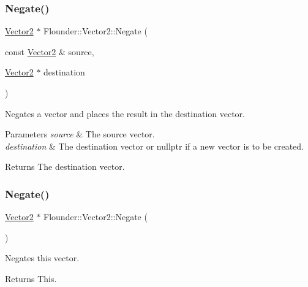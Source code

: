 \subsubsection{\texorpdfstring{Negate()}{Negate()}\hspace{0.1cm}{\footnotesize\ttfamily [1/2]}}
{\footnotesize\ttfamily \hyperlink{class_flounder_1_1_vector2}{Vector2} $\ast$ Flounder\+::\+Vector2\+::\+Negate (\begin{DoxyParamCaption}\item[{const \hyperlink{class_flounder_1_1_vector2}{Vector2} \&}]{source,  }\item[{\hyperlink{class_flounder_1_1_vector2}{Vector2} $\ast$}]{destination }\end{DoxyParamCaption})\hspace{0.3cm}{\ttfamily [static]}}



Negates a vector and places the result in the destination vector. 


\begin{DoxyParams}{Parameters}
{\em source} & The source vector. \\
\hline
{\em destination} & The destination vector or nullptr if a new vector is to be created. \\
\hline
\end{DoxyParams}
\begin{DoxyReturn}{Returns}
The destination vector. 
\end{DoxyReturn}
\mbox{\label{class_flounder_1_1_vector2_a1822df39dd87d89831ccf9b0d264607a}} 
\subsubsection{\texorpdfstring{Negate()}{Negate()}\hspace{0.1cm}{\footnotesize\ttfamily [2/2]}}
{\footnotesize\ttfamily \hyperlink{class_flounder_1_1_vector2}{Vector2} $\ast$ Flounder\+::\+Vector2\+::\+Negate (\begin{DoxyParamCaption}{ }\end{DoxyParamCaption})}



Negates this vector. 

\begin{DoxyReturn}{Returns}
This. 
\end{DoxyReturn}
\mbox{\label{class_flounder_1_1_vector2_ab95dd4cfef120743c76e7f727966fbe2}} 
